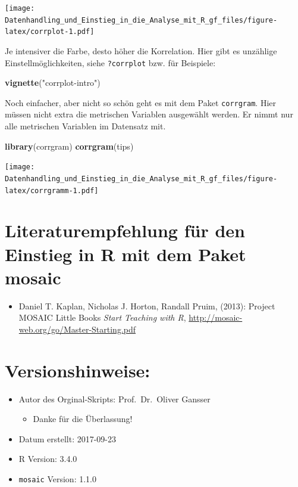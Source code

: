 \documentclass[10pt,ngerman,onside]{article}
\newenvironment{Shaded}{\begin{snugshade}}{\end{snugshade}}
\newcommand{\KeywordTok}[1]{\textcolor[rgb]{0.13,0.29,0.53}{\textbf{#1}}}
\newcommand{\StringTok}[1]{\textcolor[rgb]{0.31,0.60,0.02}{#1}}
\newcommand{\NormalTok}[1]{#1}
\providecommand{\tightlist}{%
  \setlength{\itemsep}{0pt}\setlength{\parskip}{0pt}}
\begin{document}
\texttt{[image: Datenhandling\_und\_Einstieg\_in\_die\_Analyse\_mit\_R\_gf\_files/figure-latex/corrplot-1.pdf]}

Je intensiver die Farbe, desto höher die Korrelation. Hier gibt es
unzählige Einstellmöglichkeiten, siehe \texttt{?corrplot} bzw. für
Beispiele:

\begin{Shaded}
\begin{Highlighting}[]
\KeywordTok{vignette}\NormalTok{(}\StringTok{"corrplot-intro"}\NormalTok{)}
\end{Highlighting}
\end{Shaded}

Noch einfacher, aber nicht so schön geht es mit dem Paket
\texttt{corrgram}. Hier müssen nicht extra die metrischen Variablen
ausgewählt werden. Er nimmt nur alle metrischen Variablen im Datensatz
mit.

\begin{Shaded}
\begin{Highlighting}[]
\KeywordTok{library}\NormalTok{(corrgram)}
\KeywordTok{corrgram}\NormalTok{(tips)}
\end{Highlighting}
\end{Shaded}

\texttt{[image: Datenhandling\_und\_Einstieg\_in\_die\_Analyse\_mit\_R\_gf\_files/figure-latex/corrgramm-1.pdf]}

\newpage

\hypertarget{literaturempfehlung-fur-den-einstieg-in-r-mit-dem-paket-mosaic}{%
\section{Literaturempfehlung für den Einstieg in R mit dem Paket
mosaic}\label{literaturempfehlung-fur-den-einstieg-in-r-mit-dem-paket-mosaic}}

\begin{itemize}
\tightlist
\item
  Daniel T. Kaplan, Nicholas J. Horton, Randall Pruim, (2013): Project
  MOSAIC Little Books \emph{Start Teaching with R},
  \url{http://mosaic-web.org/go/Master-Starting.pdf}
\end{itemize}

\hypertarget{versionshinweise}{%
\section{Versionshinweise:}\label{versionshinweise}}

\begin{itemize}
\tightlist
\item
  Autor des Orginal-Skripts: Prof.~Dr.~Oliver Gansser

  \begin{itemize}
  \tightlist
  \item
    Danke für die Überlassung!
  \end{itemize}
\item
  Datum erstellt: 2017-09-23
\item
  R Version: 3.4.0
\item
  \texttt{mosaic} Version: 1.1.0
\end{itemize}
\end{document}
